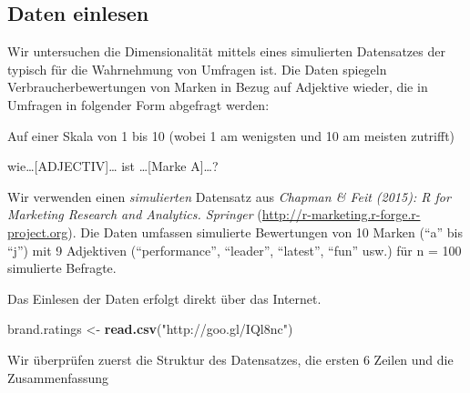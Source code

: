 \documentclass[12pt,]{book}
\newenvironment{Shaded}{\begin{snugshade}}{\end{snugshade}}
\newcommand{\KeywordTok}[1]{\textcolor[rgb]{0.13,0.29,0.53}{\textbf{{#1}}}}
\newcommand{\StringTok}[1]{\textcolor[rgb]{0.31,0.60,0.02}{{#1}}}
\newcommand{\NormalTok}[1]{{#1}}
\begin{document}
\subsection{Daten einlesen}\label{daten-einlesen-1}

Wir untersuchen die Dimensionalität mittels eines simulierten
Datensatzes der typisch für die Wahrnehmung von Umfragen ist. Die Daten
spiegeln Verbraucherbewertungen von Marken in Bezug auf Adjektive
wieder, die in Umfragen in folgender Form abgefragt werden:

Auf einer Skala von 1 bis 10 (wobei 1 am wenigsten und 10 am meisten
zutrifft)

wie\ldots{}{[}ADJECTIV{]}\ldots{} ist \ldots{}{[}Marke A{]}\ldots{}?

Wir verwenden einen \emph{simulierten} Datensatz aus \emph{Chapman \&
Feit (2015): R for Marketing Research and Analytics. Springer}
(\url{http://r-marketing.r-forge.r-project.org}). Die Daten umfassen
simulierte Bewertungen von 10 Marken (``a'' bis ``j'') mit 9 Adjektiven
(``performance'', ``leader'', ``latest'', ``fun'' usw.) für n = 100
simulierte Befragte.

Das Einlesen der Daten erfolgt direkt über das Internet.

\begin{Shaded}
\begin{Highlighting}[]
\NormalTok{brand.ratings <-}\StringTok{ }\KeywordTok{read.csv}\NormalTok{(}\StringTok{"http://goo.gl/IQl8nc"}\NormalTok{)}
\end{Highlighting}
\end{Shaded}

Wir überprüfen zuerst die Struktur des Datensatzes, die ersten 6 Zeilen
und die Zusammenfassung
\end{document}

